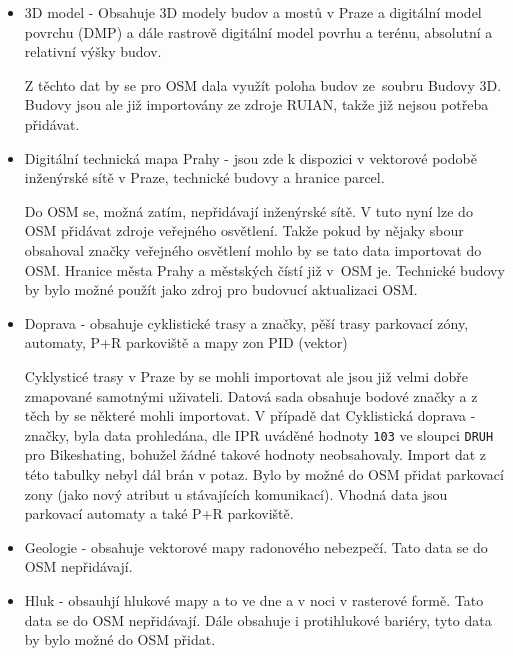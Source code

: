 \begin{itemize}
    \item   3D model - Obsahuje 3D modely budov a mostů v Praze a digitální
            model povrchu (DMP) a dále rastrově digitální model povrhu a
            terénu, absolutní a relativní výšky budov.

            Z těchto dat by se pro OSM dala využít poloha budov ze~soubru
            Budovy 3D. Budovy jsou ale již importovány ze zdroje RUIAN, takže
            již nejsou potřeba přidávat.

    \item   Digitální technická mapa Prahy - jsou zde k dispozici v vektorové
            podobě inženýrské sítě v Praze, technické budovy a hranice parcel.

            Do OSM se, možná zatím, nepřidávají inženýrské sítě. V tuto nyní
            lze do OSM přidávat zdroje veřejného osvětlení. Takže pokud by
            nějaky sbour obsahoval značky veřejného osvětlení mohlo by se tato
            data importovat do OSM. Hranice města Prahy a městských čístí již
            v~OSM je. Technické budovy by bylo možné použít jako zdroj
            pro budovucí aktualizaci OSM.

    \item   Doprava - obsahuje cyklistické trasy a značky, pěší trasy
            parkovací zóny, automaty, P+R parkoviště a mapy zon PID (vektor)

            Cyklysticé trasy v Praze by se mohli importovat ale jsou již velmi
            dobře zmapované samotnými uživateli. Datová sada obsahuje bodové značky
            a z těch by se některé mohli importovat.
            V případě dat Cyklistická doprava - značky, byla data prohledána, dle IPR
            uváděné hodnoty {\tt 103} ve sloupci {\tt DRUH} pro Bikeshating, bohužel žádné
            takové hodnoty neobsahovaly. Import dat z této tabulky nebyl dál brán v potaz.
            Bylo by možné do OSM přidat parkovací zony (jako nový atribut u stávajících komunikací).
            Vhodná data jsou parkovací automaty a také P+R parkoviště.

    \item   Geologie - obsahuje vektorové mapy radonového nebezpečí. Tato data
            se do OSM nepřidávají.

    \item   Hluk - obsauhjí hlukové mapy a to ve dne a v noci v rasterové formě.
            Tato data se do OSM nepřidávají. Dále obsahuje i protihlukové bariéry,
            tyto data by bylo možné do OSM přidat.


\end{itemize}
